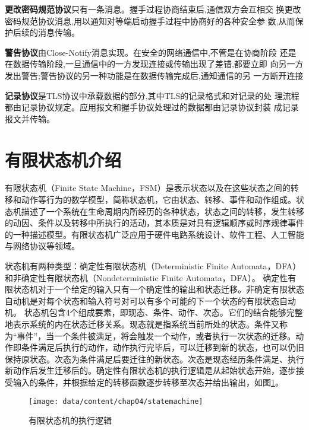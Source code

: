 \textbf{更改密码规范协议}只有一条消息。握手过程协商结束后,通信双方会互相交
换更改密码规范协议消息,用以通知对等端启动握手过程中协商好的各种安全参
数,从而保护后续的消息传输。

\textbf{警告协议}由Close-Notify消息实现。在安全的网络通信中,不管是在协商阶段
还是在数据传输阶段,一旦通信中的一方发现连接或传输出现了差错,都要立即
向另一方发出警告;警告协议的另一种功能是在数据传输完成后,通知通信的另
一方断开连接

\textbf{记录协议}是TLS协议中承载数据的部分,其中TLS的记录格式和对记录的处
理流程都由记录协议规定。应用报文和握手协议处理过的数据都由记录协议封装
成记录报文并传输。




\section{有限状态机介绍}
有限状态机（Finite State Machine，FSM）是表示状态以及在这些状态之间的转移和动作等行为的数学模型，简称状态机，它由状态、转移、事件和动作组成。状态机描述了一个系统在生命周期内所经历的各种状态，状态之间的转移，发生转移的动因、条件以及转移中所执行的活动，其本质是对具有逻辑顺序或时序规律事件的一种描述模型\cite{tanabe2020model}。有限状态机广泛应用于硬件电路系统设计、软件工程、人工智能与网络协议等领域。

状态机有两种类型：确定性有限状态机（Deterministic Finite Automata，DFA）和非确定性有限状态机（Nondeterministic Finite Automata，DFA）。 确定性有限状态机对于一个给定的输入只有一个确定性的输出和状态迁移。非确定有限状态自动机是对每个状态和输入符号对可以有多个可能的下一个状态的有限状态自动机。
状态机包含4个组成要素，即现态、条件、动作、次态。它们的结合能够完整地表示系统的内在状态迁移关系。现态就是指系统当前所处的状态。条件又称为“事件”，当一个条件被满足，将会触发一个动作，或者执行一次状态的迁移。动作即条件满足后执行的动作，动作执行完毕后，可以迁移到新的状态，也可以仍旧保持原状态。次态为条件满足后要迁往的新状态。次态是现态经历条件满足、执行新动作后发生迁移后的。确定性有限状态机的执行逻辑是从起始状态开始，逐步接受输入的条件，并根据给定的转移函数逐步转移至次态并给出输出，如图\ref{fig-chap02-state_machine}。 
\begin{figure}[htp]
	\centering
	\texttt{[image: data/content/chap04/statemachine]}
	\caption{有限状态机的执行逻辑}
	\label{fig-chap02-state_machine}
\end{figure}

